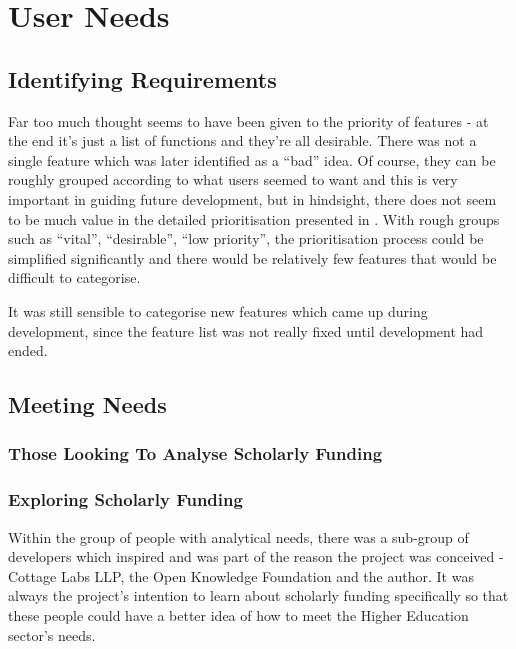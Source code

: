 \section{User Needs}
\subsection{Identifying Requirements}
Far too much thought seems to have been given to the priority of features - at the end it's just a list of functions and they're all desirable. There was not a single feature which was later identified as a ``bad'' idea. Of course, they can be roughly grouped according to what users seemed to want and this is very important in guiding future development, but in hindsight, there does not seem to be much value in the detailed prioritisation presented in . With rough groups such as ``vital'', ``desirable'', ``low priority'', the prioritisation process could be simplified significantly and there would be relatively few features that would be difficult to categorise.

It was still sensible to categorise new features which came up during development, since the feature list was not really fixed until development had ended.

\subsection{Meeting Needs}

\subsubsection{Those Looking To Analyse Scholarly Funding}

\subsubsection{Exploring Scholarly Funding}
Within the group of people with analytical needs, there was a sub-group of developers which inspired and was part of the reason the project was conceived - Cottage Labs LLP, the Open Knowledge Foundation and the author. It was always the project's intention to learn about scholarly funding specifically so that these people could have a better idea of how to meet the Higher Education sector's needs.

